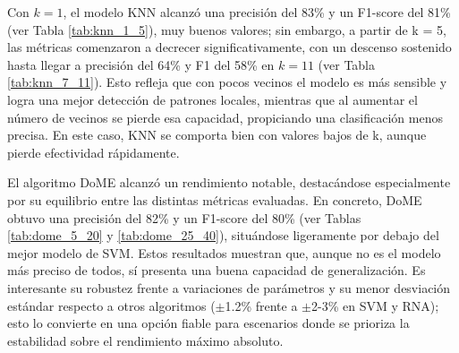 \documentclass[a4paper,10pt]{article}
\begin{document}
    Con $k = 1$, el modelo KNN alcanzó una precisión del 83\% y un F1-score del 81\% (ver Tabla \ref{tab:knn_1_5}), muy buenos valores; sin embargo, a partir de k = 5, las métricas comenzaron a decrecer significativamente, con un descenso sostenido hasta llegar a precisión del 64\% y F1 del 58\% en $k = 11$ (ver Tabla \ref{tab:knn_7_11}). Esto refleja que con pocos vecinos el modelo es más sensible y logra una mejor detección de patrones locales, mientras que al aumentar el número de vecinos se pierde esa capacidad, propiciando una clasificación menos precisa. En este caso, KNN se comporta bien con valores bajos de k, aunque pierde efectividad rápidamente.
    
    El algoritmo DoME alcanzó un rendimiento notable, destacándose especialmente por su equilibrio entre las distintas métricas evaluadas. En concreto, DoME obtuvo una precisión del 82\% y un F1-score del 80\% (ver Tablas \ref{tab:dome_5_20} y \ref{tab:dome_25_40}), situándose ligeramente por debajo del mejor modelo de SVM. Estos resultados muestran que, aunque no es el modelo más preciso de todos, sí presenta una buena capacidad de generalización. Es interesante su robustez frente a variaciones de parámetros y su menor desviación estándar respecto a otros algoritmos ($\pm$1.2\% frente a $\pm$2-3\% en SVM y RNA); esto lo convierte en una opción fiable para escenarios donde se prioriza la estabilidad sobre el rendimiento máximo absoluto.
\end{document}
